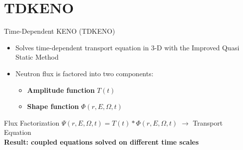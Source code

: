 \section{TDKENO}

\begin{frame}{Time-Dependent KENO (TDKENO)}

\begin{itemize}

    \item Solves time-dependent transport equation in 3-D with the Improved Quasi Static Method
    \item Neutron flux is factored into two components:
    \begin{itemize}
        \item \textbf{Amplitude function} {\large $T(t)$ }
        \item \textbf{Shape function} {\large $\Phi(r,E,\Omega,t)$ } 
    \end{itemize}
\end{itemize}

\vspace{5mm}

\begin{block}{Flux Factorization}
\centering
$ \Psi(r,E,\Omega,t) =T(t) * \Phi(r,E,\Omega,t)$ $\rightarrow$ Transport Equation \\
\textbf{Result: coupled equations solved on different time scales}
\end{block}


\end{frame}